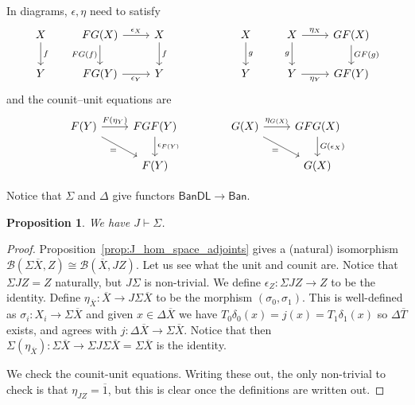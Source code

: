 \documentclass[a4paper,11pt]{article}
\theoremstyle{plain}
\newtheorem{proposition}{Proposition}[section]
\theoremstyle{remark}
\newcommand{\mc}[1]{\mathcal{#1}}
\newcommand{\msf}[1]{\mathsf{#1}}
\begin{document}
In diagrams, $\epsilon,\eta$ need to satisfy
\[ \begin{tikzcd}
X \arrow[d, "f"]    &
FG(X) \arrow[r, "\epsilon_X"] \arrow[d, "FG(f)"'] & X \arrow[d, "f"]
\\
Y    &
FG(Y) \arrow[r, "\epsilon_Y"']  & Y
\end{tikzcd}
\qquad\qquad\qquad
\begin{tikzcd}
X \arrow[d, "g"]    &
X \arrow[r, "\eta_X"] \arrow[d, "g"'] & GF(X) \arrow[d, "GF(g)"]
\\
Y    &
Y \arrow[r, "\eta_Y"']  & GF(Y)
\end{tikzcd}    \]
and the counit--unit equations are
\[ \begin{tikzcd}
F(Y) \arrow[r, "F(\eta_Y)"] \arrow[rd, "="'] & FGF(Y) \arrow[d, "\epsilon_{F(Y)}"] \\
& F(Y)
\end{tikzcd}
\qquad\qquad
\begin{tikzcd}
G(X) \arrow[r, "\eta_{G(X)}"] \arrow[rd, "="'] & GFG(X) \arrow[d, "G(\epsilon_X)"] \\
& G(X)
\end{tikzcd}
\]

Notice that $\Sigma$ and $\Delta$ give functors $\msf{BanDL} \to \msf{Ban}$.

\begin{proposition}
We have $J \vdash \Sigma$.
\end{proposition}
\begin{proof}
Proposition~\ref{prop:J_hom_space_adjoints} gives a (natural) isomorphism $\mc B(\Sigma\overline X, Z) \cong \mc B(\overline X, JZ)$.  Let us see what the unit and counit are.  Notice that $\Sigma JZ = Z$ naturally, but $J\Sigma$ is non-trivial.  We define $\epsilon_Z \colon \Sigma JZ \to Z$ to be the identity.  Define $\eta_{\overline X} \colon \overline X \to J\Sigma\overline X$ to be the morphism $(\sigma_0, \sigma_1)$.  This is well-defined as $\sigma_i \colon X_i \to \Sigma\overline X$ and given $x\in\Delta\overline X$ we have $T_0\delta_0(x) = j(x) = T_1\delta_1(x)$ so $\Delta\overline T$ exists, and agrees with $j\colon \Delta\overline X \to \Sigma\overline X$.  Notice that then $\Sigma(\eta_{\overline X}) \colon \Sigma\overline X \to \Sigma J\Sigma \overline X = \Sigma\overline X$ is the identity.

We check the counit-unit equations.  Writing these out, the only non-trivial to check is that $\eta_{JZ} = \overline{1}$, but this is clear once the definitions are written out.
\end{proof}
\end{document}
